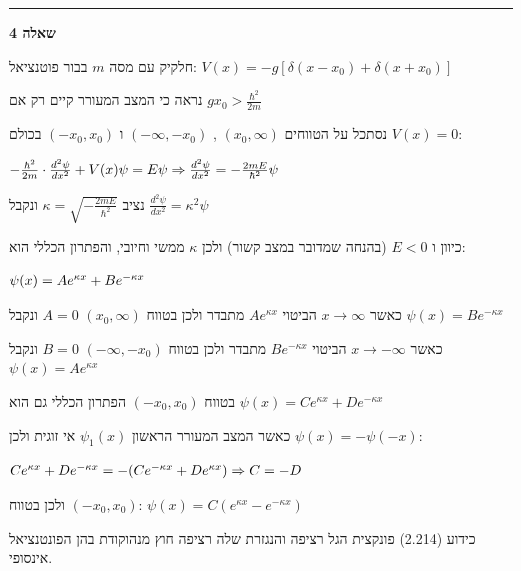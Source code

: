 \documentclass[14pt]{extarticle}
\makeatletter
\newenvironment{lefteqs}{%
    \begin{english}%
    \begin{flushleft}%
    \renewcommand{\arraystretch}{1.3}%
    $\begin{array}{@{}l@{}}%
}{%
    \end{array}$%
    \end{flushleft}%
    \end{english}%
}
\makeatother
\begin{document}
\vspace{3em}
\hrule
\vspace{2em}

\textbf{\large שאלה 4}

חלקיק עם מסה $m$ בבור פוטנציאל: $V(x) = -g [\delta(x-x_0) + \delta(x+x_0)]$

נראה כי המצב המעורר קיים רק אם $gx_0 > \frac{\hbar^2}{2m}$

נסתכל על הטווחים $(x_0, \infty)$ , $(-\infty, -x_0)$ ו $(-x_0, x_0)$ בכולם $V(x)=0$:

\begin{lefteqs}
    -\frac{\hbar^2}{2m} \cdot \frac{d^2 \psi}{dx^2} + V(x) \psi = E \psi \Rightarrow \frac{d^2 \psi}{dx^2} = -\frac{2mE}{\hbar^2} \psi
\end{lefteqs}

נציב $\kappa = \sqrt{-\frac{2mE}{\hbar^2}}$ ונקבל $\frac{d^2 \psi}{dx^2} = \kappa^2 \psi$

כיוון ו $E<0$ (בהנחה שמדובר במצב קשור) ולכן $\kappa$ ממשי וחיובי, והפתרון הכללי הוא:
\begin{lefteqs}
    \psi(x) = A e^{\kappa x} + B e^{-\kappa x} \\
\end{lefteqs}
כאשר $x \rightarrow \infty$ הביטוי $A e^{\kappa x}$ מתבדר ולכן בטווח $(x_0, \infty)$ $A=0$ ונקבל $\psi(x) = B e^{-\kappa x}$

כאשר $x \rightarrow -\infty$ הביטוי $B e^{-\kappa x}$ מתבדר ולכן בטווח $(-\infty, -x_0)$ $B=0$ ונקבל $\psi(x) = A e^{\kappa x}$

בטווח $(-x_0, x_0)$ הפתרון הכללי גם הוא $\psi(x) = C e^{\kappa x} + D e^{-\kappa x}$

כאשר המצב המעורר הראשון $\psi_1(x)$ אי זוגית ולכן $\psi(x) = -\psi(-x)$:

\begin{lefteqs}
    C e^{\kappa x} + D e^{-\kappa x} = - (C e^{-\kappa x} + D e^{\kappa x}) \Rightarrow C=-D \\
\end{lefteqs}

ולכן בטווח $(-x_0, x_0)$:  
$\psi(x) = C (e^{\kappa x} - e^{-\kappa x})$

כידוע (2.214) פונקצית הגל רציפה והנגזרת שלה רציפה חוץ מנהוקודת בהן הפונטנציאל אינסופי.
\end{document}
